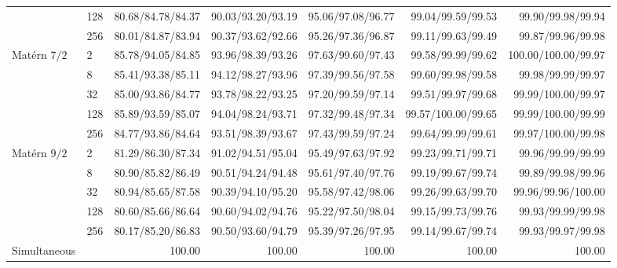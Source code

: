 \begin{table}[pos=htbp]
\begin{tabular}{@{}l|l|rrrrr@{}}
 & 128 & 80.68/84.78/84.37 & 90.03/93.20/93.19 & 95.06/97.08/96.77 & \phantom{0}99.04/\phantom{0}99.59/\phantom{0}99.53 & \phantom{0}99.90/\phantom{0}99.98/\phantom{0}99.94 \\
 & 256 & 80.01/84.87/83.94 & 90.37/93.62/92.66 & 95.26/97.36/96.87 & \phantom{0}99.11/\phantom{0}99.63/\phantom{0}99.49 & \phantom{0}99.87/\phantom{0}99.96/\phantom{0}99.98 \\[3pt]
Mat\'ern $7/2$ & 2 & 85.78/94.05/84.85 & 93.96/98.39/93.26 & 97.63/99.60/97.43 & \phantom{0}99.58/\phantom{0}99.99/\phantom{0}99.62 & 100.00/100.00/\phantom{0}99.97 \\
 & 8 & 85.41/93.38/85.11 & 94.12/98.27/93.96 & 97.39/99.56/97.58 & \phantom{0}99.60/\phantom{0}99.98/\phantom{0}99.58 & \phantom{0}99.98/\phantom{0}99.99/\phantom{0}99.97 \\
 & 32 & 85.00/93.86/84.77 & 93.78/98.22/93.25 & 97.20/99.59/97.14 & \phantom{0}99.51/\phantom{0}99.97/\phantom{0}99.68 & \phantom{0}99.99/100.00/\phantom{0}99.97 \\
 & 128 & 85.89/93.59/85.07 & 94.04/98.24/93.71 & 97.32/99.48/97.34 & \phantom{0}99.57/100.00/\phantom{0}99.65 & \phantom{0}99.99/100.00/\phantom{0}99.99 \\
 & 256 & 84.77/93.86/84.64 & 93.51/98.39/93.67 & 97.43/99.59/97.24 & \phantom{0}99.64/\phantom{0}99.99/\phantom{0}99.61 & \phantom{0}99.97/100.00/\phantom{0}99.98 \\[3pt]
Mat\'ern $9/2$ & 2 & 81.29/86.30/87.34 & 91.02/94.51/95.04 & 95.49/97.63/97.92 & \phantom{0}99.23/\phantom{0}99.71/\phantom{0}99.71 & \phantom{0}99.96/\phantom{0}99.99/\phantom{0}99.99 \\
 & 8 & 80.90/85.82/86.49 & 90.51/94.24/94.48 & 95.61/97.40/97.76 & \phantom{0}99.19/\phantom{0}99.67/\phantom{0}99.74 & \phantom{0}99.89/\phantom{0}99.98/\phantom{0}99.96 \\
 & 32 & 80.94/85.65/87.58 & 90.39/94.10/95.20 & 95.58/97.42/98.06 & \phantom{0}99.26/\phantom{0}99.63/\phantom{0}99.70 & \phantom{0}99.96/\phantom{0}99.96/100.00 \\
 & 128 & 80.60/85.66/86.64 & 90.60/94.02/94.76 & 95.22/97.50/98.04 & \phantom{0}99.15/\phantom{0}99.73/\phantom{0}99.76 & \phantom{0}99.93/\phantom{0}99.99/\phantom{0}99.98 \\
 & 256 & 80.17/85.20/86.83 & 90.50/93.60/94.79 & 95.39/97.26/97.95 & \phantom{0}99.14/\phantom{0}99.67/\phantom{0}99.74 & \phantom{0}99.93/\phantom{0}99.97/\phantom{0}99.98 \\
\midrule
Simultaneous & & 100.00 & 100.00 & 100.00 & 100.00 & 100.00 \\
\bottomrule
\end{tabular}
\end{table}
